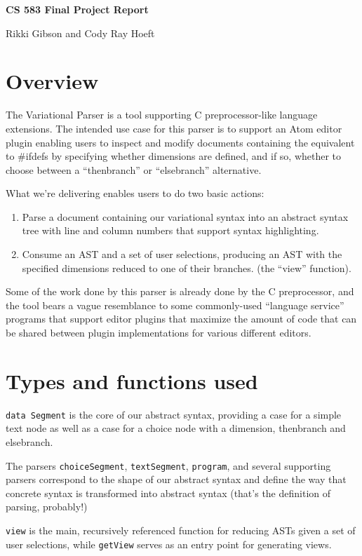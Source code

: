 \documentclass[11pt]{article}
\begin{document}
\Large\textbf{CS 583 Final Project Report}

\large{Rikki Gibson and Cody Ray Hoeft}
\normalsize
\section{Overview}
The Variational Parser is a tool supporting C preprocessor-like language extensions. The intended use case for this parser is to support an Atom editor plugin enabling users to inspect and modify documents containing the equivalent to \#ifdefs by specifying whether dimensions are defined, and if so, whether to choose between a ``thenbranch'' or ``elsebranch'' alternative.

What we're delivering enables users to do two basic actions:

\begin{enumerate}
\item Parse a document containing our variational syntax into an abstract syntax tree with line and column numbers that support syntax highlighting.
\item Consume an AST and a set of user selections, producing an AST with the specified dimensions reduced to one of their branches. (the ``view'' function).
\end{enumerate}
Some of the work done by this parser is already done by the C preprocessor, and the tool bears a vague resemblance to some commonly-used ``language service'' programs that support editor plugins that maximize the amount of code that can be shared between plugin implementations for various different editors.

\section{Types and functions used}
\texttt{data Segment} is the core of our abstract syntax, providing a case for a simple text node as well as a case for a choice node with a dimension, thenbranch and elsebranch.

The parsers \texttt{choiceSegment}, \texttt{textSegment}, \texttt{program}, and several supporting parsers correspond to the shape of our abstract syntax and define the way that concrete syntax is transformed into abstract syntax (that's the definition of parsing, probably!)

\texttt{view} is the main, recursively referenced function for reducing ASTs given a set of user selections, while \texttt{getView} serves as an entry point for generating views.
\end{document}
